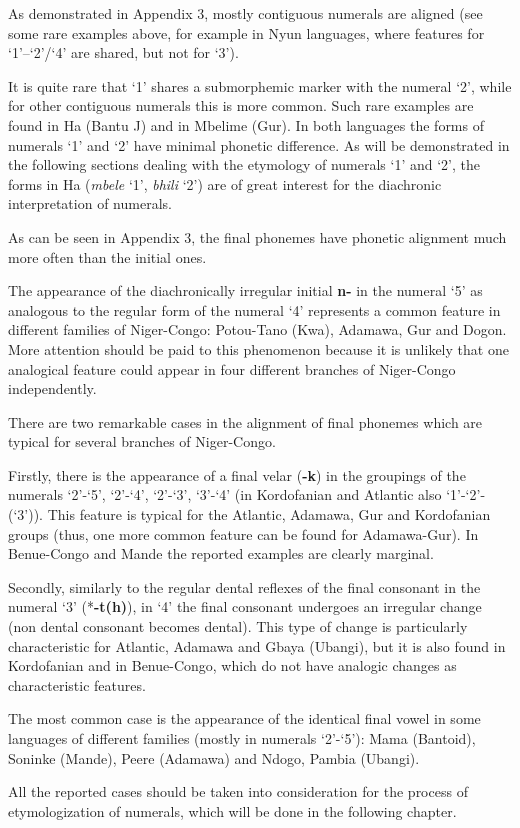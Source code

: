 As demonstrated in Appendix 3, mostly contiguous numerals are aligned (see some rare examples above, for example in Nyun languages, where features for ‘1’–‘2’/‘4’ are shared, but not for `3'). 

It is quite rare that ‘1’ shares a submorphemic marker with the numeral ‘2’, while for other contiguous numerals this is more common.  Such rare examples are found in Ha (Bantu J) and in Mbelime (Gur). In both languages the forms of numerals ‘1’ and ‘2’ have minimal phonetic difference. As will be demonstrated in the following sections dealing with the etymology of numerals ‘1’ and ‘2’, the forms in Ha (\textit{mbele} ‘1’, \textit{bhili} ‘2’) are of great interest for the diachronic interpretation of numerals.

As can be seen in Appendix 3, the final phonemes have phonetic alignment much more often than the initial ones. 

The appearance of the diachronically irregular initial \textbf{n-} in the numeral ‘5’ as analogous to the regular form of the numeral ‘4’ represents a common feature in different families of Niger-Congo: Potou-Tano (Kwa), Adamawa, Gur and Dogon. More attention should be paid to this phenomenon because it is unlikely that one analogical feature could appear in four different branches of Niger-Congo independently. 

There are two remarkable cases in the alignment of final phonemes which are typical for several branches of Niger-Congo. 

Firstly, there is the appearance of a final velar (\textbf{-k}) in the groupings of the numerals ‘2’-‘5’, ‘2’-‘4’, ‘2’-‘3’, ‘3’-‘4’ (in Kordofanian and Atlantic also ‘1’-‘2’-(‘3’)).  This feature is typical for the Atlantic, Adamawa, Gur and Kordofanian groups (thus, one more common feature can be found for Adamawa-Gur). In Benue-Congo and Mande the reported examples are clearly marginal. 

Secondly, similarly to the regular dental reflexes of the final consonant in the numeral ‘3’ (*\textbf{-t(h)}), in ‘4’ the final consonant undergoes an irregular change (non dental consonant becomes dental). This type of change is particularly characteristic for Atlantic, Adamawa and Gbaya (Ubangi), but it is also found in Kordofanian and in Benue-Congo, which do not have analogic changes as characteristic features. 

The most common case is the appearance of the identical final vowel in some languages of different families (mostly in numerals ‘2’-‘5’): Mama (Bantoid), Soninke (Mande), Peere (Adamawa) and Ndogo, Pambia (Ubangi).

All the reported cases should be taken into consideration for the process of etymologization of numerals, which will be done in the following chapter. 

